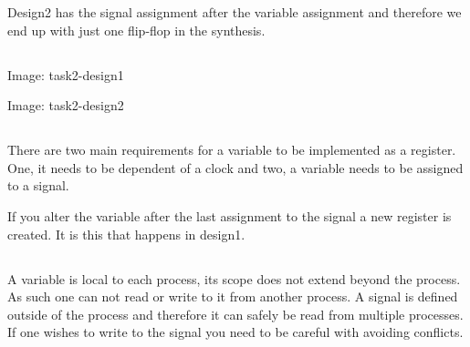 \documentclass{article}
\begin{document}
Design2 has the signal assignment after the variable assignment and
therefore we end up with just one flip-flop in the synthesis.

\subsection{}
Image: task2-design1

Image: task2-design2

\subsection{}
There are two main requirements for a variable to be implemented as a
register. One, it needs to be dependent of a clock and two, a variable
needs to be assigned to a signal.

If you alter the variable after the last assignment to the signal a
new register is created. It is this that happens in design1.

\subsection{}
A variable is local to each process, its scope does not extend beyond
the process. As such one can not read or write to it from another
process. A signal is defined outside of the process and therefore
it can safely be read from multiple processes. If one wishes to write
to the signal you need to be careful with avoiding conflicts.
\end{document}
